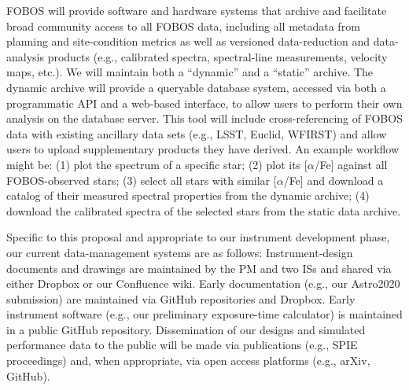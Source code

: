 \documentclass[oneside,11pt]{amsart}
\begin{document}

 FOBOS will provide software and hardware
systems that archive and facilitate broad community access to all
FOBOS data, including all metadata from planning and site-condition
metrics as well as versioned data-reduction and data-analysis
products (e.g., calibrated spectra, spectral-line measurements,
velocity maps, etc.). We will maintain both a ``dynamic'' and a
``static'' archive. The dynamic archive will provide a queryable
database system, accessed via both a programmatic API and a web-based
interface, to allow users to perform their own analysis on the
database server. This tool will include cross-referencing of FOBOS
data with existing ancillary data sets (e.g., LSST, Euclid, WFIRST)
and allow users to upload supplementary products they have derived.
An example workflow might be: (1) plot the spectrum of a specific
star; (2) plot its [$\alpha$/Fe] against all FOBOS-observed stars;
(3) select all stars with similar [$\alpha$/Fe] and download a
catalog of their measured spectral properties from the dynamic
archive; (4) download the calibrated spectra of the selected stars
from the static data archive.

\medskip


Specific to this proposal and appropriate to our instrument
development phase, our current data-management systems are as
follows: Instrument-design documents and drawings are maintained by
the PM and two ISs and shared via either Dropbox or our Confluence
wiki. Early documentation (e.g., our Astro2020 submission) are
maintained via GitHub repositories and Dropbox. Early instrument
software (e.g., our preliminary exposure-time calculator) is
maintained in a public GitHub repository. Dissemination of our
designs and simulated performance data to the public will be made via
publications (e.g., SPIE proceedings) and, when appropriate, via open
access platforms (e.g., arXiv, GitHub).
\end{document}
